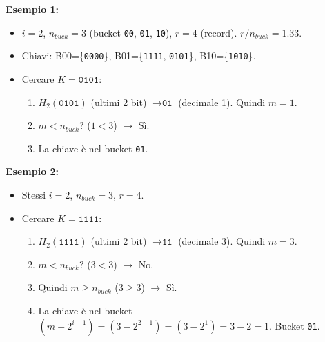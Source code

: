 \textbf{Esempio 1:}
\begin{itemize}
    \item $i = 2$, $n_{buck} = 3$ (bucket \texttt{00}, \texttt{01}, \texttt{10}), $r = 4$ (record). $r/n_{buck} = 1.33$.
    \item Chiavi: B00=\{\texttt{0000}\}, B01=\{\texttt{1111}, \texttt{0101}\}, B10=\{\texttt{1010}\}.
    \item Cercare $K = \texttt{0101}$:
    \begin{enumerate}
        \item $H_2(\texttt{0101})$ (ultimi 2 bit) $\rightarrow \texttt{01}$ (decimale 1). Quindi $m = 1$.
        \item $m < n_{buck}$? ($1 < 3$) $\rightarrow$ Sì.
        \item La chiave è nel bucket \texttt{01}.
    \end{enumerate}
\end{itemize}

\textbf{Esempio 2:}
\begin{itemize}
    \item Stessi $i=2$, $n_{buck}=3$, $r=4$.
    \item Cercare $K = \texttt{1111}$:
    \begin{enumerate}
        \item $H_2(\texttt{1111})$ (ultimi 2 bit) $\rightarrow \texttt{11}$ (decimale 3). Quindi $m = 3$.
        \item $m < n_{buck}$? ($3 < 3$) $\rightarrow$ No.
        \item Quindi $m \ge n_{buck}$ ($3 \ge 3$) $\rightarrow$ Sì.
        \item La chiave è nel bucket $(m - 2^{i-1}) = (3 - 2^{2-1}) = (3 - 2^1) = 3 - 2 = 1$. Bucket \texttt{01}.
    \end{enumerate}
\end{itemize}

